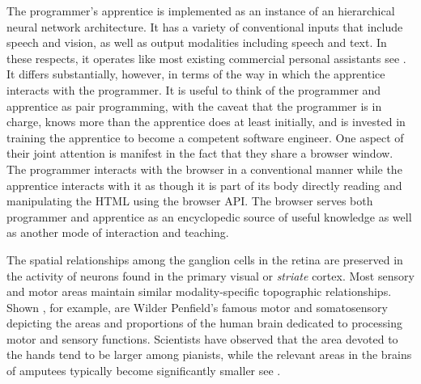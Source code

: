 The programmer's apprentice is implemented as an instance of an hierarchical neural network architecture. It has a variety of conventional inputs that include speech and vision, as well as output modalities including speech and text. In these respects, it operates like most existing commercial personal assistants \emdash{} see {{}}. It differs substantially, however, in terms of the way in which the apprentice interacts with the programmer. It is useful to think of the programmer and apprentice as pair programming, with the caveat that the programmer is in charge, knows more than the apprentice does \emdash{} at least initially, and is invested in training the apprentice to become a competent software engineer. One aspect of their joint attention is manifest in the fact that they share a browser window. The programmer interacts with the browser in a conventional manner while the apprentice interacts with it as though it is part of its body directly reading and manipulating the HTML using the browser API. The browser serves both programmer and apprentice as an encyclopedic source of useful knowledge as well as another mode of interaction and teaching.

The spatial relationships among the ganglion cells in the retina are preserved in the activity of neurons found in the primary visual \emdash{} or {\it{striate}} \emdash{} cortex. Most sensory and motor areas maintain similar modality-specific topographic relationships. Shown {{}}, for example, are Wilder Penfield's famous motor and somatosensory {} depicting the areas and proportions of the human brain dedicated to processing motor and sensory functions. Scientists have observed that the area devoted to the hands tend to be larger among pianists, while the relevant areas in the brains of amputees typically become significantly smaller \emdash{} see {{}}.


